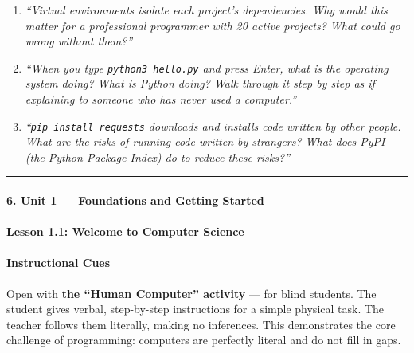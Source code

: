 \documentclass[
  justified,
  openright,
]{tufte-book}
\let\subsection\paragraph
\let\paragraph\paragraph
\let\subsection\paragraph
\let\paragraph\paragraph
\begin{document}
\begin{enumerate}
\def\labelenumi{\arabic{enumi}.}
\item
  \emph{``Virtual environments isolate each project's dependencies. Why
  would this matter for a professional programmer with 20 active
  projects? What could go wrong without them?''}
\item
  \emph{``When you type \texttt{python3\ hello.py} and press Enter, what
  is the operating system doing? What is Python doing? Walk through it
  step by step as if explaining to someone who has never used a
  computer.''}
\item
  \emph{``\texttt{pip\ install\ requests} downloads and installs code
  written by other people. What are the risks of running code written by
  strangers? What does PyPI (the Python Package Index) do to reduce
  these risks?''}
\end{enumerate}

\begin{center}\rule{0.5\linewidth}{0.5pt}\end{center}

\subsection{6. Unit 1 --- Foundations and Getting
Started}\label{unit-1-foundations-and-getting-started}

\subsection{Lesson 1.1: Welcome to Computer
Science}\label{lesson-1.1-welcome-to-computer-science}

\paragraph{Instructional Cues}\label{instructional-cues-2}

Open with \textbf{the ``Human Computer'' activity} ---  for blind students.
The student
gives verbal, step-by-step instructions for a simple physical task. The
teacher follows them literally, making no inferences. This demonstrates
the core challenge of programming: computers are perfectly literal and
do not fill in gaps.
\end{document}
